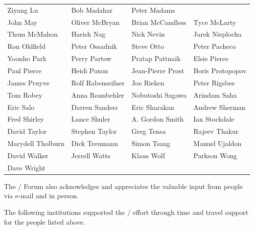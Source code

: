 \begin{center}
\begin{tabular}{llll}
Ziyang Lu &
Bob Madahar &
Peter Madams 
\\
% 
John May &
Oliver McBryan &
Brian McCandless &
Tyce McLarty \\
Thom McMahon &
Harish Nag &
Nick Nevin &
Jarek Nieplocha \\
Ron Oldfield &
Peter Ossadnik &
Steve Otto &
Peter Pacheco \\
Yoonho Park &
Perry Partow &
Pratap Pattnaik &
Elsie Pierce \\
Paul Pierce &
Heidi Poxon &
Jean-Pierre Prost &
Boris Protopopov \\
James Pruyve &
Rolf Rabenseifner &
Joe Rieken &
Peter Rigsbee \\
Tom Robey &
Anna Rounbehler &
Nobutoshi Sagawa &
Arindam Saha \\
Eric Salo &
Darren Sanders &
Eric Sharakan &
Andrew Sherman \\
Fred Shirley &
Lance Shuler &
A. Gordon Smith &
Ian Stockdale \\
David Taylor &
Stephen Taylor &
Greg Tensa &
Rajeev Thakur \\
Marydell Tholburn &
Dick Treumann &
Simon Tsang &
Manuel Ujaldon \\
David Walker &
Jerrell Watts &
Klaus Wolf &
Parkson Wong \\
Dave Wright
\end{tabular}
\end{center}

The \MPI/ Forum also acknowledges and appreciates the valuable input
from people via e-mail and in person.

The following institutions supported the \MPIII/ effort through
time and travel support for the people listed above.

\medskip

